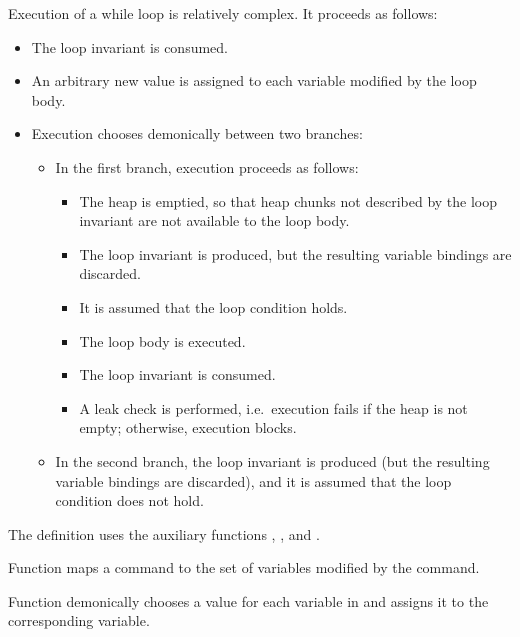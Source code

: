 \documentclass{CSML}
\theoremstyle{definition}\newtheorem{notation}[thm]{Notation}
\theoremstyle{plain}\newtheorem{satz}[thm]{Satz}
\begin{document}
Execution of a while loop is relatively complex. It proceeds as 
follows:
\begin{itemize}
\item The loop invariant is consumed.

\item An arbitrary new value is assigned to each variable 
    modified by the loop body. 
    
\item Execution chooses demonically between two branches:

\begin{itemize}
\item In the first branch, execution proceeds as 
    follows:
    
\begin{itemize}
\item The heap is emptied, so that heap chunks not 
    described by the loop invariant are not 
    available to the loop body. 
    
\item The loop invariant is produced, but the 
    resulting variable bindings are discarded. 
    
\item It is assumed that the loop condition holds. 

\item The loop body is executed.

\item The loop invariant is consumed.

\item A leak check is performed, i.e.~execution 
    fails if the heap is not empty; otherwise, 
    execution blocks.

\end{itemize}

\item In the second branch, the loop invariant is 
    produced (but the resulting variable bindings are 
    discarded), and it is assumed that the loop 
    condition does not hold.
    
\end{itemize}

\end{itemize}

The definition uses the auxiliary functions , 
, and .

Function  maps a command to the set of 
variables modified by the command.

Function  demonically chooses a 
value for each variable in  and assigns it to the 
corresponding variable.
\end{document}
